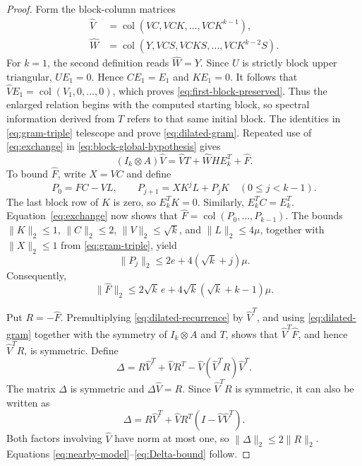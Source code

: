 \documentclass[11pt]{article}
\theoremstyle{definition}
\newcommand{\col}{\operatorname{col}}
\begin{document}
\begin{proof}
Form the block-column matrices
\begin{equation}
\begin{split}
 \widehat V&=\col(VC,VCK,\ldots,VCK^{k-1}),\\
 \widehat W&=\col(Y,VCS,VCKS,\ldots,VCK^{k-2}S).
\end{split}
\label{eq:dilation}
\end{equation}
For $k=1$, the second definition reads $\widehat W=Y$.  Since $U$ is
strictly block upper triangular, $UE_1=0$.  Hence $CE_1=E_1$ and $KE_1=0$.
It follows that $\widehat V E_1=\col(V_1,0,\ldots,0)$, which proves
\eqref{eq:first-block-preserved}.
Thus the enlarged relation begins with the computed starting block, so
spectral information derived from $T$ refers to that same initial block.
The identities in \eqref{eq:gram-triple} telescope and prove
\eqref{eq:dilated-gram}.  Repeated use of \eqref{eq:exchange} in
\eqref{eq:block-global-hypothesis} gives
\begin{equation}
 (I_k\otimes A)\widehat V
 =\widehat VT+\widehat WHE_k^T+\widehat F.
 \label{eq:dilated-recurrence}
\end{equation}
To bound $\widehat F$, write $X=VC$ and define
\[
 P_0=FC-VL,
 \qquad
 P_{j+1}=XK^jL+P_jK\quad(0\le j<k-1).
\]
The last block row of $K$ is zero, so $E_k^TK=0$.  Similarly,
$E_k^TC=E_k^T$.  Equation~\eqref{eq:exchange} now shows that
$\widehat F=\col(P_0,\ldots,P_{k-1})$.  The bounds
$\|K\|_2\le1$, $\|C\|_2\le2$, $\|V\|_2\le\sqrt{k}$, and
$\|L\|_2\le4\mu$, together with
$\|X\|_2\le1$ from \eqref{eq:gram-triple}, yield
\[
 \|P_j\|_2\le2e+4(\sqrt{k}+j)\mu.
\]
Consequently,
\begin{equation}
 \|\widehat F\|_2
 \le2\sqrt{k}\,e+4\sqrt{k}(\sqrt{k}+k-1)\mu.
 \label{eq:Fhat-bound}
\end{equation}

Put $R=-\widehat F$.  Premultiplying \eqref{eq:dilated-recurrence} by
$\widehat V^T$, and using \eqref{eq:dilated-gram} together with the symmetry
of $I_k\otimes A$ and $T$, shows that $\widehat V^T\widehat F$, and hence
$\widehat V^TR$, is symmetric.  Define
\begin{equation}
 \Delta=R\widehat V^T+\widehat VR^T
 -\widehat V(\widehat V^TR)\widehat V^T.
 \label{eq:symmetric-completion}
\end{equation}
The matrix $\Delta$ is symmetric and $\Delta\widehat V=R$.  Since
$\widehat V^TR$ is symmetric, it can also be written as
\[
 \Delta=R\widehat V^T+
 \widehat VR^T(I-\widehat V\widehat V^T).
\]
Both factors involving $\widehat V$ have norm at most one, so
$\|\Delta\|_2\le2\|R\|_2$.  Equations
\eqref{eq:nearby-model}--\eqref{eq:Delta-bound} follow.
\end{proof}
\end{document}
